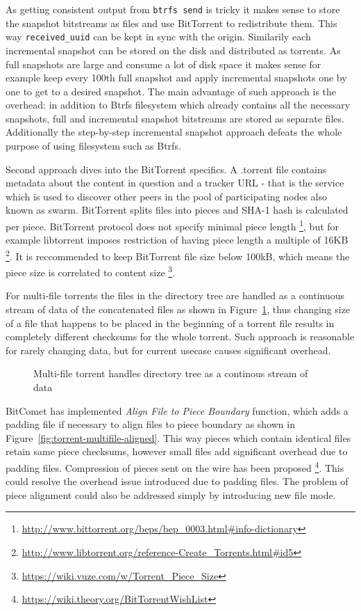 \documentclass[a4paper,11pt]{kth-mag}
\begin{document}
As getting consistent output from \texttt{btrfs send}
is tricky it makes sense to store the snapshot
bitstreams as files and use BitTorrent to redistribute them.
This way \texttt{received\_uuid} can be kept in sync with the origin.
Similarily each incremental snapshot can be stored on the
disk and distributed as torrents.
As full snapshots are large and consume a lot
of disk space it makes sense for example
keep every 100th full snapshot and apply
incremental snapshots one by one to get
to a desired snapshot.
The main advantage of such approach is the overhead:
in addition to Btrfs filesystem which already
contains all the necessary snapshots,
full and incremental snapshot bitstreams
are stored as separate files.
Additionally the step-by-step incremental
snapshot approach defeats the whole
purpose of using filesystem such as Btrfs.

Second approach dives into the BitTorrent specifics.
A .torrent file contains metadata about the content in question and a
tracker URL - that is the service which is used to discover other peers in the
pool of participating nodes also known as swarm.
BitTorrent splits files into pieces and SHA-1 hash is calculated per piece.
BitTorrent protocol does not specify minimal piece length
\footnote{\url{http://www.bittorrent.org/beps/bep_0003.html\#info-dictionary}},
but for example libtorrent imposes restriction of having piece length
a multiple of 16KB
\footnote{\url{http://www.libtorrent.org/reference-Create_Torrents.html\#id5}}.
It is reccommended to keep BitTorrent file size below 100kB,
which means the piece size is correlated to content size
\footnote{\url{https://wiki.vuze.com/w/Torrent_Piece_Size}}.

For multi-file torrents the files in the directory tree are handled
as a continuous stream of data of the concatenated files
as shown in Figure~\ref{fig:torrent-multifile},
thus changing size of a file that happens to be placed in the beginning of a torrent
file results in completely different checksums for the whole torrent.
Such approach is reasonable for rarely changing data, but for current usecase
causes significant overhead.


\begin{figure}[!htb]
\centering
\scalebox{0.35}{}
\caption{Multi-file torrent handles directory tree as a continous stream of data}
\label{fig:torrent-multifile}
\end{figure}

BitComet has implemented \emph{Align File to Piece Boundary} function,
which adds a padding file if necessary to align files to piece boundary
as shown in Figure~\ref{fig:torrent-multifile-aligned}.
This way pieces which contain identical files retain same piece checksums,
however small files add significant overhead due to padding files.
Compression of pieces sent on the wire has been proposed
\footnote{\url{https://wiki.theory.org/BitTorrentWishList}}.
This could resolve the overhead issue introduced due to padding files.
The problem of piece alignment could also be addressed
simply by introducing new file mode.
\end{document}
